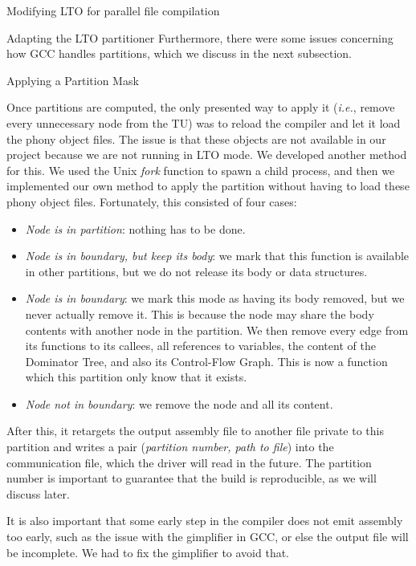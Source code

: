 \begin{section}{Modifying LTO for parallel file compilation}
\begin{subsection}{Adapting the LTO partitioner}
Furthermore, there were some issues concerning how GCC handles
partitions, which we discuss in the next subsection.

\end{subsection}

\begin{subsection}{Applying a Partition Mask}\label{sec:partition_mask}

Once partitions are computed, the only presented way to apply it
(\textit{i.e.}, remove every unnecessary node from the TU) was to reload the
compiler and let it load the phony object files. The issue is that these
objects are not available in our project because we are not running in LTO
mode. We developed another method for this.
We used the Unix \textit{fork} function to spawn a child process, and then
we implemented our own method to apply the partition without having to load
these phony object files. Fortunately, this consisted
of four cases:
\begin{itemize}
	\item \textit{Node is in partition}: nothing has to be done.
	\item \textit{Node is in boundary, but keep its body}: we mark that this function
	is available in other partitions, but we do not release its body or
	data structures.
	\item \textit{Node is in boundary}: we mark this mode as having its body removed,
	but we never actually remove it. This is because the node may share the
	body contents with another node in the partition. We then remove
	every edge from its functions to its callees, all references to variables,
	the content of the Dominator Tree, and also its Control-Flow Graph. This
	is now a function which this partition only know that it exists.
	\item \textit{Node not in boundary}: we remove the node and all its content.
\end{itemize}

After this, it retargets the output assembly file to another file private to
this partition and writes a pair (\textit{partition number, path to file}) into the
communication file, which the driver will read in the future. The partition
number is important to guarantee that the build is reproducible, as we will
discuss later.

It is also important that some early step in the compiler does not emit assembly
too early, such as the issue with the gimplifier in GCC, or else the output
file will be incomplete. We had to fix the gimplifier to avoid that.


\end{subsection}
\end{section}

